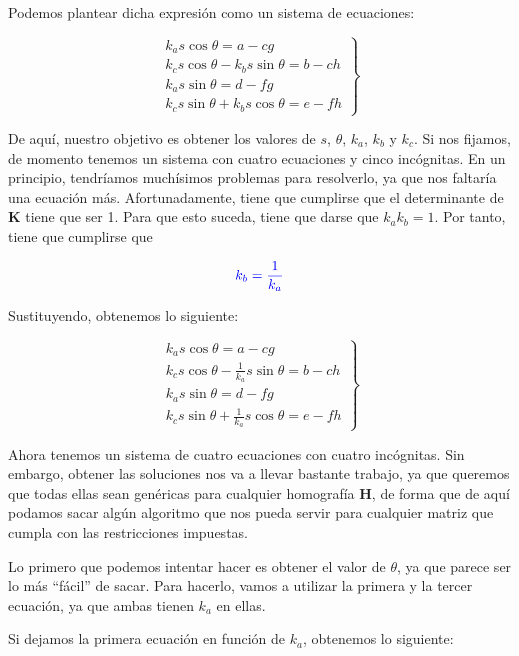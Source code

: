 \documentclass[11pt,a4paper]{article}
\begin{document}
Podemos plantear dicha expresión como un sistema de ecuaciones:

\begin{equation}
\left.\begin{matrix}
 k_as\cos\theta = a-cg \\
 k_cs\cos\theta - k_bs\sin\theta = b -ch \\
 k_as\sin\theta = d-fg \\
 k_cs\sin\theta + k_bs\cos\theta = e-fh
\end{matrix}\right\}
\end{equation}

De aquí, nuestro objetivo es obtener los valores de $s$, $\theta$,
$k_a$, $k_b$ y $k_c$. Si nos fijamos, de momento tenemos un sistema
con cuatro ecuaciones y cinco incógnitas. En un principio, tendríamos
muchísimos problemas para resolverlo, ya que nos faltaría una ecuación
más. Afortunadamente, tiene que cumplirse que el determinante de $\mathbf{K}$ tiene que
ser 1. Para que esto suceda, tiene que darse que $k_a k_b = 1$. Por tanto, tiene que cumplirse
que

$$\textcolor{blue}{k_b = \frac{1}{k_a}}$$

Sustituyendo, obtenemos lo siguiente:

\begin{equation}
\left.\begin{matrix}
 k_as\cos\theta = a-cg \\
 k_cs\cos\theta - \frac{1}{k_a}s\sin\theta = b -ch \\
 k_as\sin\theta = d-fg \\
 k_cs\sin\theta + \frac{1}{k_a}s\cos\theta = e-fh
\end{matrix}\right\}
\end{equation}

Ahora tenemos un sistema de cuatro ecuaciones con cuatro
incógnitas. Sin embargo, obtener las soluciones nos va a llevar
bastante trabajo, ya que queremos que todas ellas sean genéricas
para cualquier homografía $\mathbf{H}$, de forma que de aquí
podamos sacar algún algoritmo que nos pueda servir para
cualquier matriz que cumpla con las restricciones impuestas.

Lo primero que podemos intentar hacer es obtener el valor de $\theta$,
ya que parece ser lo más ``fácil'' de sacar. Para hacerlo, vamos
a utilizar la primera y la tercer ecuación, ya que ambas tienen
$k_a$ en ellas.

Si dejamos la primera ecuación en función de $k_a$, obtenemos
lo siguiente:
\end{document}
